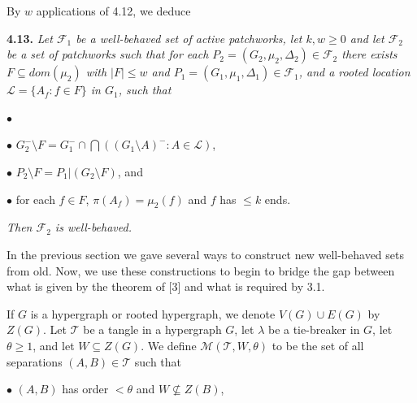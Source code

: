 By $w$ applications of 4.12, we deduce

\textbf{4.13.} \textit{Let $\mathcal{F}_1$ be a well-behaved set of active patchworks, let $k, w \ge 0$ and let $\mathcal{F}_2$ be a set of patchworks such that for each $P_2 = (G_2, \mu_2, \Delta_2) \in \mathcal{F}_2$ there exists $F \subseteq dom(\mu_2)$ with $|F| \le w$ and $P_1 = (G_1, \mu_1, \Delta_1) \in \mathcal{F}_1$, and a rooted location $\mathcal{L} = \{A_f : f \in F\}$ in $G_1$, such that}

\hspace*{12pt}$\bullet$ 

\hspace*{12pt}$\bullet$ $G_2^- \setminus F = G_1^- \cap \bigcap((G_1 \setminus A)^- : A \in \mathcal{L})$,

\hspace*{12pt}$\bullet$ $P_2 \setminus F = P_1|(G_2 \setminus F)$, and

\hspace*{12pt}$\bullet$ for each $f \in F$, $\pi(A_f) = \mu_2(f)$ and $f$ has $\le k$ ends.

\textit{Then $\mathcal{F}_2$ is well-behaved.}


In the previous section we gave several ways to construct new well-behaved sets from old. Now, we use these constructions to begin to bridge the gap between what is given by the theorem of [3] and what is required by 3.1.

If $G$ is a hypergraph or rooted hypergraph, we denote $V(G) \cup E(G)$ by $Z(G)$. Let $\mathcal{T}$ be a tangle in a hypergraph $G$, let $\lambda$ be a tie-breaker in $G$, let $\theta \ge 1$, and let $W \subseteq Z(G)$. We define $\mathcal{M}(\mathcal{T}, W, \theta)$ to be the set of all separations $(A, B) \in \mathcal{T}$ such that

\hspace*{12pt}$\bullet$ $(A, B)$ has order $< \theta$ and $W \nsubseteq Z(B)$,

